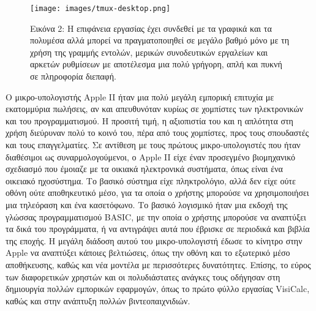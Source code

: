 \documentclass[
]{article}
\begin{document}
\leavevmode{}%
\begin{figure}
\hypertarget{fig:tmux-desktop}{%
\centering
\texttt{[image: images/tmux-desktop.png]}
\caption{Εικόνα 2: Η επιφάνεια εργασίας έχει συνδεθεί με τα γραφικά και
τα πολυμέσα αλλά μπορεί να πραγματοποιηθεί σε μεγάλο βαθμό μόνο με τη
χρήση της γραμμής εντολών, μερικών συνοδευτικών εργαλείων και αρκετών
ρυθμίσεων με αποτέλεσμα μια πολύ γρήγορη, απλή και πυκνή σε πληροφορία
διεπαφή.}\label{fig:tmux-desktop}
}
\end{figure}

Ο μικρο-υπολογιστής Apple II ήταν μια πολύ μεγάλη εμπορική επιτυχία με
εκατομμύρια πωλήσεις, αν και απευθυνόταν κυρίως σε χομπίστες των
ηλεκτρονικών και του προγραμματισμού. Η προσιτή τιμή, η αξιοπιστία του
και η απλότητα στη χρήση διεύρυναν πολύ το κοινό του, πέρα από τους
χομπίστες, προς τους σπουδαστές και τους επαγγελματίες. Σε αντίθεση με
τους πρώτους μικρο-υπολογιστές που ήταν διαθέσιμοι ως συναρμολογούμενοι,
ο Apple II είχε έναν προσεγμένο βιομηχανικό σχεδιασμό που έμοιαζε με τα
οικιακά ηλεκτρονικά συστήματα, όπως είναι ένα οικειακό ηχοσύστημα. Το
βασικό σύστημα είχε πληκτρολόγιο, αλλά δεν είχε ούτε οθόνη ούτε
αποθηκευτικό μέσο, για τα οποία ο χρήστης μπορούσε να χρησιμοποιήσει μια
τηλεόραση και ένα κασετόφωνο. Το βασικό λογισμικό ήταν μια εκδοχή της
γλώσσας προγραμματισμού BASIC, με την οποία ο χρήστης μπορούσε να
αναπτύξει τα δικά του προγράμματα, ή να αντιγράψει αυτά που έβρισκε σε
περιοδικά και βιβλία της εποχής. Η μεγάλη διάδοση αυτού του
μικρο-υπολογιστή έδωσε το κίνητρο στην Apple να αναπτύξει κάποιες
βελτιώσεις, όπως την οθόνη και το εξωτερικό μέσο αποθήκευσης, καθώς και
νέα μοντέλα με περισσότερες δυνατότητες. Επίσης, το εύρος των
διαφορετικών χρηστών και οι πολυδιάστατες ανάγκες τους οδήγησαν στη
δημιουργία πολλών εμπορικών εφαρμογών, όπως το πρώτο φύλλο εργασίας
VisiCalc, καθώς και στην ανάπτυξη πολλών βιντεοπαιχνιδιών.
\end{document}
